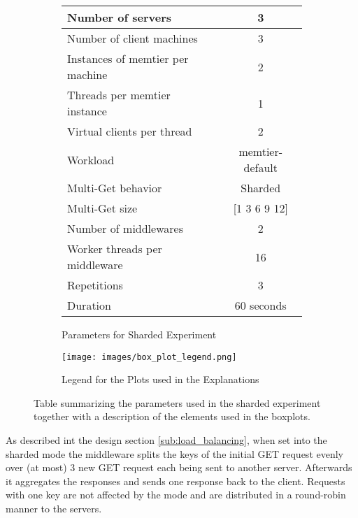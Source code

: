 \documentclass[11pt,a4paper]{article}
\begin{document}
\begin{figure}[H]
\centering

\begin{subfigure}{.5\textwidth}

\begin{center}
	\scriptsize{
		\begin{tabular}{|l|c|}
			\hline Number of servers                & 3                       \\ 
			\hline Number of client machines        & 3                       \\ 
			\hline Instances of memtier per machine & 2                       \\ 
			\hline Threads per memtier instance     & 1                       \\
			\hline Virtual clients per thread       & 2     		            \\ 
			\hline Workload                         & memtier-default             \\
			\hline Multi-Get behavior               & Sharded                 \\
			\hline Multi-Get size                   & [1 3 6 9 12]                 \\
			\hline Number of middlewares            & 2                       \\
			\hline Worker threads per middleware    & 16 \\
			\hline Repetitions                      & 3 \\
			\hline Duration                         & 60 seconds \\
			\hline 
		\end{tabular}
	} 
\end{center}
\caption{Parameters for Sharded Experiment}
\label{tbl:sharded_exp_summary}
    
\end{subfigure}%
\begin{subfigure}{.5\textwidth}
    \centering
    \texttt{[image: images/box\_plot\_legend.png]}
    \caption{Legend for the Plots used in the Explanations}
    \label{fig:boxplot_legend}

\end{subfigure}
\caption{Table summarizing the parameters used in the sharded experiment together with a description of the elements used in the boxplots.}
\label{fig:boxplot_leg}
\end{figure}

As described int the design section \ref{sub:load_balancing}, when set into the sharded mode the middleware splits the keys of the initial GET request evenly over (at most) 3 new GET request each being sent to another server. Afterwards it aggregates the responses and sends one response back to the client. Requests with one key are not affected by the mode and are distributed in a round-robin manner to the servers. 
\end{document}
